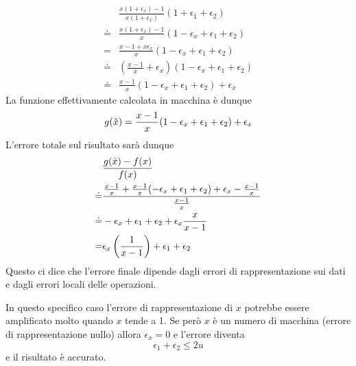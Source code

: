 \begin{example}
\begin{align*}
		       & \frac{x (1 + \epsilon_x) - 1}{x (1 + \epsilon_x)} (1 + \epsilon_1 + \epsilon_2)        \\
		\doteq & \frac{x (1 + \epsilon_x) - 1}{x} (1 - \epsilon_x + \epsilon_1 + \epsilon_2)            \\
		=      & \frac{x - 1 + x \epsilon_x}{x} (1 - \epsilon_x + \epsilon_1 + \epsilon_2)              \\
		\doteq & \left( \frac{x - 1}{x} + \epsilon_x \right) (1 - \epsilon_x + \epsilon_1 + \epsilon_2) \\
		\doteq & \frac{x - 1}{x} (1 - \epsilon_x + \epsilon_1 + \epsilon_2) + \epsilon_x
	\end{align*}
	La funzione effettivamente calcolata in macchina è dunque
	\[ g(\tilde{x}) = \frac{x - 1}{x} (1 - \epsilon_x + \epsilon_1 + \epsilon_2) + \epsilon_x \]
	L'errore totale sul risultato sarà dunque
	\begin{align*}
		       & \frac{g(\tilde{x}) - f(x)}{f(x)}                                                                  \\
		\doteq & \frac{\frac{x - 1}{x} + \frac{x-1}{x}(-\epsilon_x + \epsilon_1 + \epsilon_2) + \epsilon_x -
		\frac{x - 1}{x}}{\frac{x-1}{x}}                                                                      \\
		\doteq & -\epsilon_x + \epsilon_1 + \epsilon_2 + \epsilon_x \frac{x}{x - 1}                          \\
		=      & \epsilon_x \left( \frac{1}{x - 1} \right) + \epsilon_1 + \epsilon_2
	\end{align*}
	Questo ci dice che l'errore finale dipende dagli errori di rappresentazione sui dati e dagli errori locali
	delle operazioni.

	In questo specifico caso l'errore di rappresentazione di $x$ potrebbe essere amplificato molto quando $x$
	tende a 1. Se però $x$ è un numero di macchina (errore di rappresentazione nullo) allora $\epsilon_x = 0$
	e l'errore diventa
	\[ \epsilon_1 + \epsilon_2 \leq 2 u \]
	e il risultato è accurato.
\end{example}
